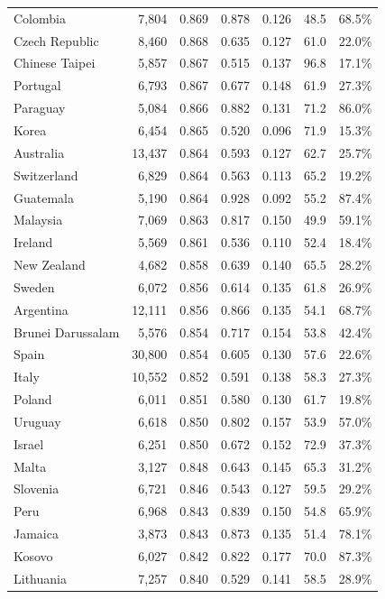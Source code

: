 \begin{table}[htp]
\begin{tabular}{@{}lrrrrrr@{}}
Colombia & 7,804 & 0.869 & 0.878 & 0.126 & 48.5 & 68.5\% \\
Czech Republic & 8,460 & 0.868 & 0.635 & 0.127 & 61.0 & 22.0\% \\
Chinese Taipei & 5,857 & 0.867 & 0.515 & 0.137 & 96.8 & 17.1\% \\
Portugal & 6,793 & 0.867 & 0.677 & 0.148 & 61.9 & 27.3\% \\
Paraguay & 5,084 & 0.866 & 0.882 & 0.131 & 71.2 & 86.0\% \\
Korea & 6,454 & 0.865 & 0.520 & 0.096 & 71.9 & 15.3\% \\
Australia & 13,437 & 0.864 & 0.593 & 0.127 & 62.7 & 25.7\% \\
Switzerland & 6,829 & 0.864 & 0.563 & 0.113 & 65.2 & 19.2\% \\
Guatemala & 5,190 & 0.864 & 0.928 & 0.092 & 55.2 & 87.4\% \\
Malaysia & 7,069 & 0.863 & 0.817 & 0.150 & 49.9 & 59.1\% \\
Ireland & 5,569 & 0.861 & 0.536 & 0.110 & 52.4 & 18.4\% \\
New Zealand & 4,682 & 0.858 & 0.639 & 0.140 & 65.5 & 28.2\% \\
Sweden & 6,072 & 0.856 & 0.614 & 0.135 & 61.8 & 26.9\% \\
Argentina & 12,111 & 0.856 & 0.866 & 0.135 & 54.1 & 68.7\% \\
Brunei Darussalam & 5,576 & 0.854 & 0.717 & 0.154 & 53.8 & 42.4\% \\
Spain & 30,800 & 0.854 & 0.605 & 0.130 & 57.6 & 22.6\% \\
Italy & 10,552 & 0.852 & 0.591 & 0.138 & 58.3 & 27.3\% \\
Poland & 6,011 & 0.851 & 0.580 & 0.130 & 61.7 & 19.8\% \\
Uruguay & 6,618 & 0.850 & 0.802 & 0.157 & 53.9 & 57.0\% \\
Israel & 6,251 & 0.850 & 0.672 & 0.152 & 72.9 & 37.3\% \\
Malta & 3,127 & 0.848 & 0.643 & 0.145 & 65.3 & 31.2\% \\
Slovenia & 6,721 & 0.846 & 0.543 & 0.127 & 59.5 & 29.2\% \\
Peru & 6,968 & 0.843 & 0.839 & 0.150 & 54.8 & 65.9\% \\
Jamaica & 3,873 & 0.843 & 0.873 & 0.135 & 51.4 & 78.1\% \\
Kosovo & 6,027 & 0.842 & 0.822 & 0.177 & 70.0 & 87.3\% \\
Lithuania & 7,257 & 0.840 & 0.529 & 0.141 & 58.5 & 28.9\% \\

\end{tabular}
\end{table}
